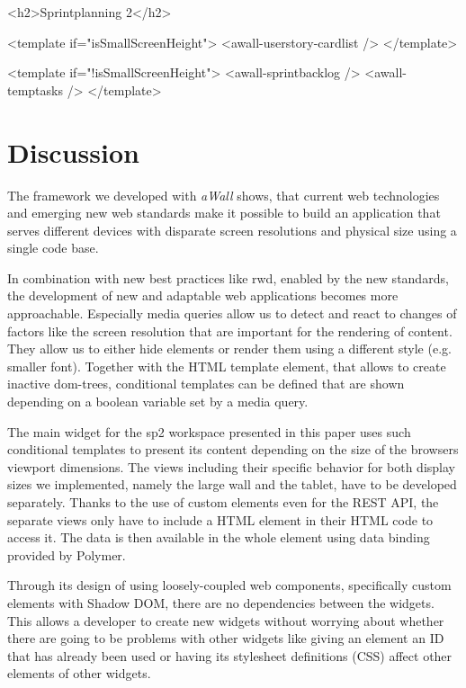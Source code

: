 \documentclass{sigchi}
\begin{document}
\begin{code}[caption={How the \gls{sp2} main widget decides which view to show.},label=lst:sp2-template]
<h2>Sprintplanning 2</h2>

<template if="{{isSmallScreenHeight}}">
  <awall-userstory-cardlist />
</template>

<template if="{{!isSmallScreenHeight}}">
  <awall-sprintbacklog />
  <awall-temptasks />
</template>
\end{code}


\section{Discussion}
The framework we developed with \textit{aWall} shows, that current web technologies and emerging new web standards make it possible to build an application that serves different devices with disparate screen resolutions and physical size using a single code base. 

In combination with new best practices like \gls{rwd}, enabled by the new standards, the development of new and adaptable web applications becomes more approachable.
Especially media queries allow us to detect and react to changes of factors like the screen resolution that are important for the rendering of content.
They allow us to either hide elements or render them using a different style (e.g. smaller font).
Together with the HTML template element, that allows to create inactive \gls{dom}-trees, conditional templates can be defined that are shown depending on a boolean variable set by a media query.

The main widget for the \gls{sp2} workspace presented in this paper uses such conditional templates to present its content depending on the size of the browsers viewport dimensions.
The views including their specific behavior for both display sizes we implemented, namely the large wall and the tablet, have to be developed separately.
Thanks to the use of custom elements even for the REST API, the separate views only have to include a HTML element in their HTML code to access it.
The data is then available in the whole element using data binding provided by Polymer.

Through its design of using loosely-coupled web components, specifically custom elements with Shadow DOM, there are no dependencies between the widgets.
This allows a developer to create new widgets without worrying about whether there are going to be problems with other widgets like  giving an element an ID that has already been used or having its stylesheet definitions (CSS) affect other elements of other widgets.
\end{document}
